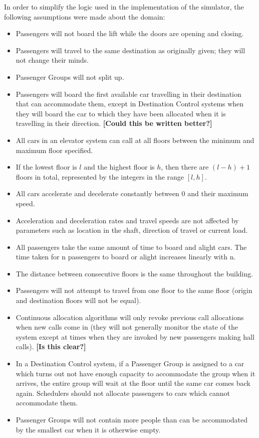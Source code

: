 \documentclass{UoYCSproject}
\begin{document}
In order to simplify the logic used in the implementation of the simulator, the following assumptions were made about the domain:
	\begin{itemize}
		\item Passengers will not board the lift while the doors are opening and closing.
		\item Passengers will travel to the same destination as originally given; they will not change their minds.
		\item Passenger Groups will not split up.
		\item Passengers will board the first available car travelling in their destination that can accommodate them, except in Destination Control systems when they will board the car to which they have been allocated when it is travelling in their direction.  \textbf{[Could this be written better?]}
		\item All cars in an elevator system can call at all floors between the minimum and maximum floor specified.
		\item If the lowest floor is $l$ and the highest floor is $h$, then there are $(l-h)+1$ floors in total, represented by the integers in the range $[l, h]$.
		\item All cars accelerate and decelerate constantly between 0 and their maximum speed.
		\item Acceleration and deceleration rates and travel speeds are not affected by parameters such as location in the shaft, direction of travel or current load.
		\item All passengers take the same amount of time to board and alight cars.  The time taken for n passengers to board or alight increases linearly with n.
		\item The distance between consecutive floors is the same throughout the building.
		\item Passengers will not attempt to travel from one floor to the same floor (origin and destination floors will not be equal).
		\item Continuous allocation algorithms will only revoke previous call allocations when new calls come in (they will not generally monitor the state of the system except at times when they are invoked by new passengers making hall calls). \textbf{[Is this clear?]}
		\item In a Destination Control system, if a Passenger Group is assigned to a car which turns out not have enough capacity to accommodate the group when it arrives, the entire group will wait at the floor until the same car comes back again.  Schedulers should not allocate passengers to cars which cannot accommodate them.
		\item Passenger Groups will not contain more people than can be accommodated by the smallest car when it is otherwise empty.
	\end{itemize}
\end{document}

